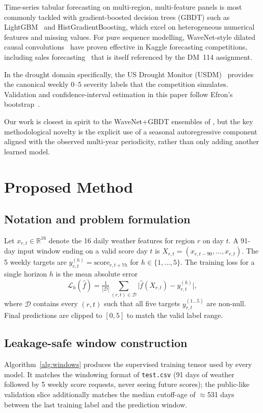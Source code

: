 \documentclass[conference,10pt,a4paper]{IEEEtran}
\begin{document}
Time-series tabular forecasting on multi-region, multi-feature panels is most commonly tackled with gradient-boosted decision trees (GBDT) such as LightGBM~\cite{ke2017lightgbm} and HistGradientBoosting, which excel on heterogeneous numerical features and missing values. For pure sequence modelling, WaveNet-style dilated causal convolutions~\cite{vandenoord2016wavenet} have proven effective in Kaggle forecasting competitions, including sales forecasting~\cite{kechyn2018wavenet} that is itself referenced by the DM~114 assignment.

In the drought domain specifically, the US Drought Monitor (USDM)~\cite{svoboda2002usdm} provides the canonical weekly $0$--$5$ severity labels that the competition simulates. Validation and confidence-interval estimation in this paper follow Efron's bootstrap~\cite{efron1979bootstrap}.

Our work is closest in spirit to the WaveNet+GBDT ensembles of \cite{kechyn2018wavenet}, but the key methodological novelty is the explicit use of a seasonal autoregressive component aligned with the observed multi-year periodicity, rather than only adding another learned model.

\section{Proposed Method}
\label{sec:method}

\subsection{Notation and problem formulation}
Let $x_{r,t}\in\mathbb{R}^{16}$ denote the 16 daily weather features for region $r$ on day $t$. A 91-day input window ending on a valid score day $t$ is $X_{r,t}=(x_{r,t-90},\ldots,x_{r,t})$. The 5 weekly targets are $y_{r,t}^{(h)}=\mathrm{score}_{r,t+7h}$ for $h\in\{1,\ldots,5\}$. The training loss for a single horizon $h$ is the mean absolute error
\[
\mathcal{L}_h(\hat f) = \tfrac{1}{|\mathcal D|}\sum_{(r,t)\in\mathcal D}\bigl|\hat f(X_{r,t}) - y_{r,t}^{(h)}\bigr|,
\]
where $\mathcal D$ contains every $(r,t)$ such that all five targets $y_{r,t}^{(1\ldots 5)}$ are non-null. Final predictions are clipped to $[0,5]$ to match the valid label range.

\subsection{Leakage-safe window construction}
Algorithm~\ref{alg:windows} produces the supervised training tensor used by every model. It matches the windowing format of \texttt{test.csv} (91 days of weather followed by 5 weekly score requests, never seeing future scores); the public-like validation slice additionally matches the median cutoff-age of $\approx$531 days between the last training label and the prediction window.
\end{document}

